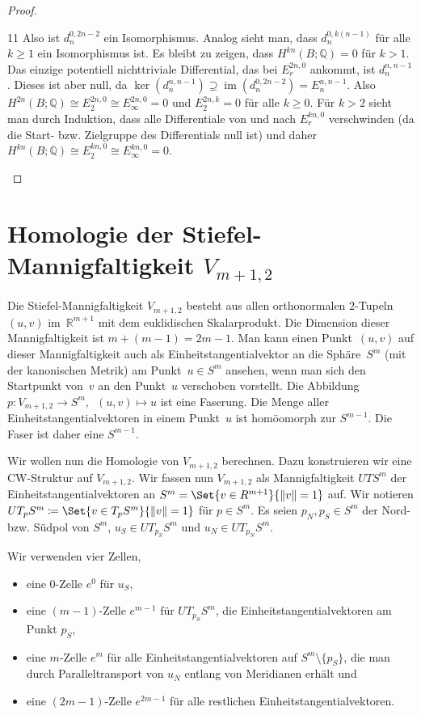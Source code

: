 \documentclass[11pt, a4paper, german]{article}
\theoremstyle{definition}
\theoremstyle{remark}
\newcommand{\R}{\mathbb{R}} %
\newcommand{\Q}{\mathbb{Q}} %
\DeclareMathOperator{\im}{im} %
\DeclarePairedDelimiter\norm{\lVert}{\rVert} %
\newcommand{\V}[2]{V_{{#2},{#1}}} %
\begin{document}
\begin{proof}
\begin{cutout}{0}{0pt}{\dimexpr\linewidth-5.5cm\relax}{11}
    Also ist $d_n^{0,2n-2}$ ein Isomorphismus.
    Analog sieht man, dass $d_n^{0,k(n-1)}$ für alle $k \geq 1$ ein Isomorphismus ist.
    Es bleibt zu zeigen, dass $H^{kn}(B; \Q) = 0$ für $k > 1$.
    Das einzige potentiell nichttriviale Differential, das bei $E_r^{2n,0}$ ankommt, ist $d_n^{n,n-1}$.
    Dieses ist aber null, da $\ker(d_n^{n,n-1}) \supseteq \im(d_n^{0,2n-2}) = E_n^{n,n-1}$.
    Also $H^{2n}(B; \Q) \cong E_2^{2n,0} \cong E_\infty^{2n,0} = 0$ und $E_2^{2n,k} = 0$ für alle $k \geq 0$.
    Für $k > 2$ sieht man durch Induktion, dass alle Differentiale von und nach $E_r^{kn,0}$ verschwinden (da die Start- bzw. Zielgruppe des Differentials null ist) und daher $H^{kn}(B; \Q) \cong E_2^{kn,0} \cong E_\infty^{kn,0} = 0$. \qedhere
  \end{cutout}
\end{proof}

\section{Homologie der Stiefel-Mannigfaltigkeit $\V{2}{m+1}$}

Die Stiefel-Mannigfaltigkeit $\V{2}{m+1}$ besteht aus allen orthonormalen $2$-Tupeln~$(u, v)$ im~$\R^{m+1}$ mit dem euklidischen Skalarprodukt.
Die Dimension dieser Mannigfaltigkeit ist $m + (m-1) = 2m - 1$.
Man kann einen Punkt~$(u, v)$ auf dieser Mannigfaltigkeit auch als Einheitstangentialvektor an die Sphäre~$S^m$ (mit der kanonischen Metrik) am Punkt~$u \in S^m$ ansehen, wenn man sich den Startpunkt von~$v$ an den Punkt~$u$ verschoben vorstellt.
Die Abbildung $p : \V{2}{m+1} \to S^m, \enspace (u, v) \mapsto u$ ist eine Faserung.
Die Menge aller Einheitstangentialvektoren in einem Punkt~$u$ ist homöomorph zur $S^{m-1}$.
Die Faser ist daher eine $S^{m-1}$.

Wir wollen nun die Homologie von $\V{2}{m+1}$ berechnen.
Dazu konstruieren wir eine CW-Struktur auf $\V{2}{m+1}$.
Wir fassen nun $\V{2}{m+1}$ als Mannigfaltigkeit $UT S^m$ der Einheitstangentialvektoren an $S^m = \Set{v \in R^{m+1}}{\norm{v} = 1}$ auf.
Wir notieren $UT_p S^m \coloneqq \Set{v \in T_p S^m}{\norm{v} = 1}$ für $p \in S^m$.
Es seien $p_N, p_S \in S^m$ der Nord- bzw. Südpol von $S^m$, $u_S \in UT_{p_S} S^m$ und $u_N \in UT_{p_N} S^m$.

Wir verwenden vier Zellen,

\begin{itemize}
  \item eine $0$-Zelle $e^0$ für $u_S$,
  \item eine $(m-1)$-Zelle $e^{m-1}$ für $UT_{p_S} S^m$, die Einheitstangentialvektoren am Punkt $p_S$,
  \item eine $m$-Zelle $e^m$ für alle Einheitstangentialvektoren auf $S^m \setminus \{ p_S \}$, die man durch Paralleltransport von $u_N$ entlang von Meridianen erhält und
  \item eine $(2m - 1)$-Zelle $e^{2m-1}$ für alle restlichen Einheitstangentialvektoren.
\end{itemize}
\end{document}
